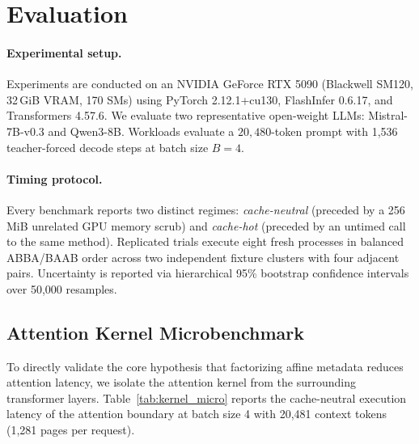 \documentclass{article}
\begin{document}


\section{Evaluation}
\label{sec:eval}
\paragraph{Experimental setup.}
Experiments are conducted on an NVIDIA GeForce RTX 5090 (Blackwell SM120, 32\,GiB VRAM, 170 SMs) using PyTorch 2.12.1+cu130, FlashInfer 0.6.17, and Transformers 4.57.6. We evaluate two representative open-weight LLMs: Mistral-7B-v0.3 and Qwen3-8B. Workloads evaluate a $20,480$-token prompt with 1,536 teacher-forced decode steps at batch size $B=4$.

\paragraph{Timing protocol.}
Every benchmark reports two distinct regimes: \textit{cache-neutral} (preceded by a 256\,MiB unrelated GPU memory scrub) and \textit{cache-hot} (preceded by an untimed call to the same method). Replicated trials execute eight fresh processes in balanced ABBA/BAAB order across two independent fixture clusters with four adjacent pairs. Uncertainty is reported via hierarchical 95\% bootstrap confidence intervals over 50,000 resamples.

\subsection{Attention Kernel Microbenchmark}
To directly validate the core hypothesis that factorizing affine metadata reduces attention latency, we isolate the attention kernel from the surrounding transformer layers. Table~\ref{tab:kernel_micro} reports the cache-neutral execution latency of the attention boundary at batch size 4 with 20,481 context tokens (1,281 pages per request).

\begin{table}[t]
\caption{Isolated attention kernel microbenchmark on RTX 5090 ($B=4$, context length 20,481 tokens). 120 timed repeats per mode with 256\,MiB cache scrubs.}
\label{tab:kernel_micro}
\centering\small
{}
\end{table}
\end{document}
